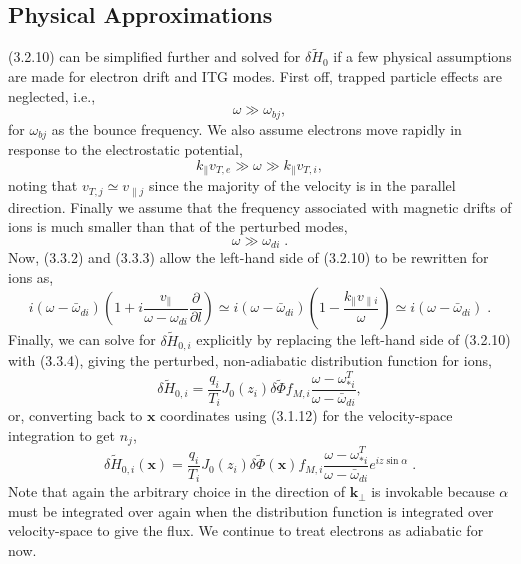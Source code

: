 \documentclass[12pt]{article}
\numberwithin{equation}{subsection}
\begin{document}
\subsection{Physical Approximations}
   \quad (3.2.10) can be simplified further and solved for $\delta\widetilde{H}_0$ if a few physical assumptions are made for electron drift and ITG modes.
First off, trapped particle effects are neglected, i.e.,
   \begin{equation}
      \omega \gg \omega_{bj},
   \end{equation}
for $\omega_{bj}$ as the bounce frequency. We also assume electrons move rapidly in response to the electrostatic potential,
   \begin{equation}
      k_\parallel v_{T,e} \gg \omega \gg k_\parallel v_{T,i},
   \end{equation}
noting that $v_{T,j} \simeq v_{\parallel j}$ since the majority of the velocity is in the parallel direction. Finally we assume that the frequency
associated with magnetic drifts of ions is much smaller than that of the perturbed modes,
   \begin{equation}
      \omega \gg \omega_{di}\;.
   \end{equation}
Now, (3.3.2) and (3.3.3) allow the left-hand side of (3.2.10) to be rewritten for ions as,
   \begin{equation}
      i(\omega-\bar{\omega}_{di})(1+i\frac{v_\parallel}{\omega-\omega_{di}}\frac{\partial}{\partial l}) \simeq
      i(\omega-\bar{\omega}_{di})(1-\frac{k_\parallel v_{\parallel i}}{\omega}) \simeq i(\omega-\bar{\omega}_{di})\;.
   \end{equation}
Finally, we can solve for $\delta\widetilde{H}_{0,i}$ explicitly by replacing the left-hand side of (3.2.10) with (3.3.4), giving
the perturbed, non-adiabatic distribution function for ions,
   \begin{equation}
      \delta\widetilde{H}_{0,i} = \frac{q_i}{T_i}J_0(z_i)\delta\widetilde{\Phi}
                                      f_{M,i}\frac{\omega-\omega_{*i}^T}{\omega-\bar{\omega}_{di}},
   \end{equation}
or, converting back to $\bm{x}$ coordinates using (3.1.12) for the velocity-space integration to get $n_j$,
   \begin{equation}
      \delta\widetilde{H}_{0,i}(\bm{x}) = \frac{q_i}{T_i}J_0(z_i)\delta\widetilde{\Phi}(\bm{x})
                                      f_{M,i}\frac{\omega-\omega_{*i}^T}{\omega-\bar{\omega}_{di}}e^{iz\sin\alpha}\;.
   \end{equation}
Note that again the arbitrary choice in the direction of $\bm{k}_\perp$ is invokable because $\alpha$ must be
integrated over again when the distribution function is integrated over velocity-space to give the flux. We continue
to treat electrons as adiabatic for now.
\end{document}
